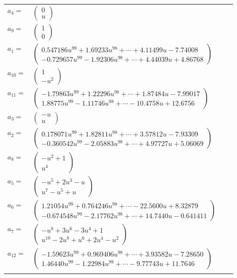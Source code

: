 \documentclass[1p]{elsarticle_modified}
\theoremstyle{definition}
\begin{document}
\begin{tabular}{m{7pt} m{180pt} m{7pt} m{180pt} }
\flushright $a_{4}=$&$\begin{pmatrix}0\\u\end{pmatrix}$ \\
\flushright $a_{9}=$&$\begin{pmatrix}1\\0\end{pmatrix}$ \\
\flushright $a_{1}=$&$\begin{pmatrix}0.547186 u^{99}+1.69233 u^{98}+\cdots+4.11499 u-7.74008\\-0.729657 u^{99}-1.92306 u^{98}+\cdots+4.44039 u+4.86768\end{pmatrix}$ \\
\flushright $a_{10}=$&$\begin{pmatrix}1\\- u^2\end{pmatrix}$ \\
\flushright $a_{11}=$&$\begin{pmatrix}-1.79863 u^{99}+1.22296 u^{98}+\cdots+1.87484 u-7.99017\\1.88775 u^{99}-1.11746 u^{98}+\cdots-10.4758 u+12.6756\end{pmatrix}$ \\
\flushright $a_{3}=$&$\begin{pmatrix}- u\\u\end{pmatrix}$ \\
\flushright $a_{2}=$&$\begin{pmatrix}0.178071 u^{99}+1.82811 u^{98}+\cdots+3.57812 u-7.93309\\-0.360542 u^{99}-2.05883 u^{98}+\cdots+4.97727 u+5.06069\end{pmatrix}$ \\
\flushright $a_{8}=$&$\begin{pmatrix}- u^2+1\\u^4\end{pmatrix}$ \\
\flushright $a_{5}=$&$\begin{pmatrix}- u^5+2 u^3- u\\u^7- u^5+u\end{pmatrix}$ \\
\flushright $a_{6}=$&$\begin{pmatrix}1.21054 u^{99}+0.764246 u^{98}+\cdots-22.5600 u+8.32879\\-0.674548 u^{99}-2.17762 u^{98}+\cdots+14.7440 u-0.641411\end{pmatrix}$ \\
\flushright $a_{7}=$&$\begin{pmatrix}- u^8+3 u^6-3 u^4+1\\u^{10}-2 u^8+u^6+2 u^4- u^2\end{pmatrix}$ \\
\flushright $a_{12}=$&$\begin{pmatrix}-1.59623 u^{99}+0.969406 u^{98}+\cdots+3.93582 u-7.28650\\1.46440 u^{99}-1.22984 u^{98}+\cdots-9.77743 u+11.7646\end{pmatrix}$\\&\end{tabular}
\end{document}
